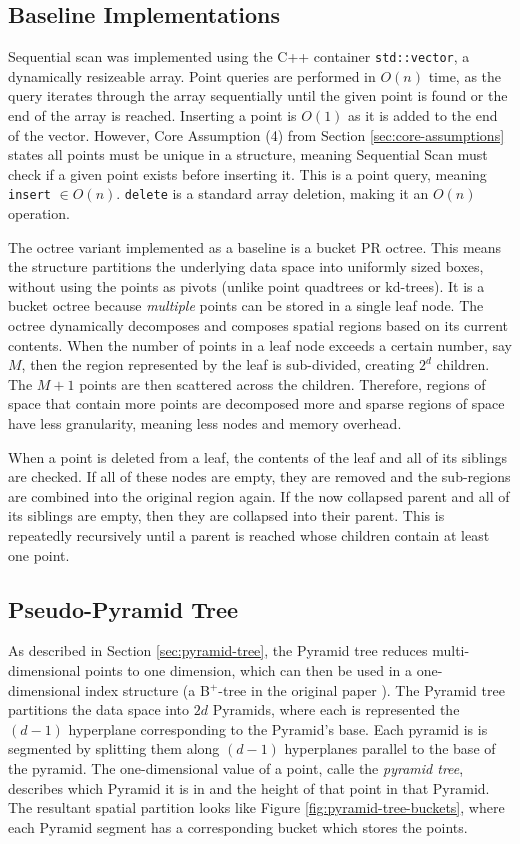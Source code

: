\subsection{Baseline Implementations}
 
Sequential scan was implemented using the C++ container \texttt{std::vector}, a dynamically resizeable array.  Point queries are performed in $O(n)$ time, as the query iterates through the array sequentially until the given point is found or the end of the array is reached. Inserting a point is $O(1)$ as it is added to the end of the vector. However, Core Assumption (4) from Section \ref{sec:core-assumptions} states all points must be unique in a structure, meaning Sequential Scan must check if a given point exists before inserting it. This is a point query, meaning \texttt{insert} $\in O(n)$. \texttt{delete} is a standard array deletion, making it an $O(n)$ operation.

The octree variant implemented as a baseline is a bucket PR octree. This means the structure partitions the underlying data space into uniformly sized boxes, without using the points as pivots (unlike point quadtrees or kd-trees). It is a bucket octree because \textit{multiple} points can be stored in a single leaf node. The octree dynamically decomposes and composes spatial regions based on its current contents. When the number of points in a leaf node exceeds a certain number, say $M$, then the region represented by the leaf is sub-divided, creating $2^d$ children. The $M + 1$ points are then scattered across the children. Therefore, regions of space that contain more points are decomposed more and sparse regions of space have less granularity, meaning less nodes and memory overhead.

When a point is deleted from a leaf, the contents of the leaf and all of its siblings are checked. If all of these nodes are empty, they are removed and the sub-regions are combined into the original region again. If the now collapsed parent and all of its siblings are empty, then they are collapsed into their parent. This is repeatedly recursively until a parent is reached whose children contain at least one point.

\subsection{Pseudo-Pyramid Tree}

As described in Section \ref{sec:pyramid-tree}, the Pyramid tree reduces multi-dimensional points to one dimension, which can then be used in a one-dimensional index structure (a B${}^{+}$-tree in the original paper \cite{pyramid-tree}). The Pyramid tree partitions the data space into $2d$ Pyramids, where each is represented the $(d - 1)$ hyperplane  corresponding to the Pyramid's base. Each pyramid is is segmented by splitting them along $(d-1)$ hyperplanes parallel to the base of the pyramid. The one-dimensional value of a point, calle the \textit{pyramid tree}, describes which Pyramid it is in and the height of that point in that Pyramid. The resultant spatial partition looks like Figure \ref{fig:pyramid-tree-buckets}, where each Pyramid segment has a corresponding bucket which stores the points.

